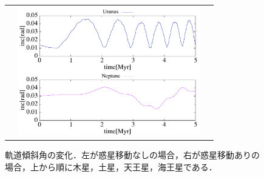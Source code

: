 \documentclass[11pt,a4paper,oneside,onecolumn]{jreport}
\begin{document}
\begin{figure}[H]
\begin{tabular}{ccc}
\begin{minipage}[t]{0.1\hsize}
\end{minipage} &
\begin{minipage}[t]{0.45\hsize}
\centering
\includegraphics[width=8cm]{./image/Move500kyr_inc_5Myr_URANEP.pdf}
\end{minipage}
%
\end{tabular}
\caption{軌道傾斜角の変化．左が惑星移動なしの場合，右が惑星移動ありの場合，上から順に木星，土星，天王星，海王星である．\label{fig:inc}}
\end{figure}
\end{document}
